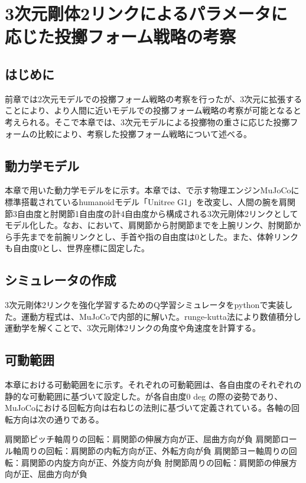 \chapter[3次元剛体2リンクによるパラメータに応じた投擲フォーム戦略の考察]{3次元剛体2リンクによるパラメータに応じた投擲フォーム戦略の考察}

\section{はじめに}
前章では2次元モデルでの投擲フォーム戦略の考察を行ったが、3次元に拡張することにより、より人間に近いモデルでの投擲フォーム戦略の考察が可能となると考えられる。そこで本章では、3次元モデルによる投擲物の重さに応じた投擲フォームの比較により、考察した投擲フォーム戦略について述べる。
\section{動力学モデル}
本章で用いた動力学モデルをに示す。本章では、で示す物理エンジンMuJoCoに標準搭載されているhumanoidモデル「Unitree G1」を改変し、人間の腕を肩関節3自由度と肘関節1自由度の計4自由度から構成される3次元剛体2リンクとしてモデル化した。なお、において、肩関節から肘関節までを上腕リンク、肘関節から手先までを前腕リンクとし、手首や指の自由度は0とした。また、体幹リンクも自由度0とし、世界座標に固定した。
\section{シミュレータの作成}
3次元剛体2リンクを強化学習するためのQ学習シミュレータをpythonで実装した。運動方程式は、MuJoCoで内部的に解いた。runge-kutta法により数値積分し運動学を解くことで、3次元剛体2リンクの角度や角速度を計算する。
\section{可動範囲}
本章における可動範囲をに示す。それぞれの可動範囲は、各自由度のそれぞれの静的な可動範囲に基づいて設定した。が各自由度0 deg の際の姿勢であり、MuJoCoにおける回転方向は右ねじの法則に基づいて定義されている。各軸の回転方向は次の通りである。

肩関節ピッチ軸周りの回転：肩関節の伸展方向が正、屈曲方向が負
肩関節ロール軸周りの回転：肩関節の内転方向が正、外転方向が負
肩関節ヨー軸周りの回転：肩関節の内旋方向が正、外旋方向が負
肘関節周りの回転：肩関節の伸展方向が正、屈曲方向が負

